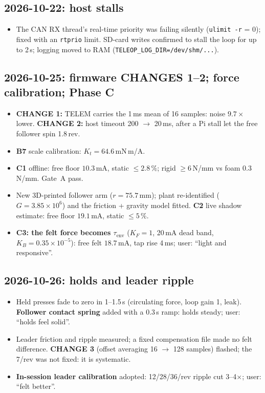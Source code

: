 \documentclass[11pt,a4paper]{article}
\newcommand{\mA}{\,\mathrm{mA}}
\begin{document}
\subsection*{2026-10-22: host stalls}
\begin{itemize}
  \item The CAN RX thread's real-time priority was failing silently
        (\texttt{ulimit -r} = 0); fixed with an \texttt{rtprio} limit.
        SD-card writes confirmed to stall the loop for up to 2\,s; logging
        moved to RAM (\texttt{TELEOP\_LOG\_DIR=/dev/shm/...}).
\end{itemize}

\subsection*{2026-10-25: firmware CHANGES 1--2; force calibration; Phase C}
\begin{itemize}
  \item \textbf{CHANGE 1:} TELEM carries the 1\,ms mean of 16 samples:
        noise $9.7\times$ lower. \textbf{CHANGE 2:} host timeout 200 $\to$
        20\,ms, after a Pi stall let the free follower spin 1.8\,rev.
  \item \textbf{B7} scale calibration: $K_t = 64.6$\,mN\,m/A.
  \item \textbf{C1} offline: free floor $10.3\mA$, static $\le 2.8\,\%$;
        rigid $\geq 6$\,N/mm vs foam 0.3\,N/mm. Gate~A pass.
  \item New 3D-printed follower arm ($r = 75.7$\,mm); plant re-identified
        ($G = 3.85\times10^6$) and the friction + gravity model fitted.
        \textbf{C2} live shadow estimate: free floor $19.1\mA$, static
        $\le 5\,\%$.
  \item \textbf{C3: the felt force becomes $\tau_{\mathrm{env}}$}
        ($K_F = 1$, 20\,mA dead band, $K_B = 0.35\times10^{-5}$): free felt
        $18.7\mA$, tap rise 4\,ms; user: ``light and responsive''.
\end{itemize}

\subsection*{2026-10-26: holds and leader ripple}
\begin{itemize}
  \item Held presses fade to zero in 1--1.5\,s (circulating force, loop
        gain 1, leak). \textbf{Follower contact spring} added with a 0.3\,s
        ramp: holds steady; user: ``holds feel solid''.
  \item Leader friction and ripple measured; a fixed compensation file
        made no felt difference. \textbf{CHANGE 3} (offset averaging 16
        $\to$ 128 samples) flashed; the 7/rev was not fixed: it is
        systematic.
  \item \textbf{In-session leader calibration} adopted: 12/28/36/rev
        ripple cut 3--4$\times$; user: ``felt better''.
\end{itemize}
\end{document}
